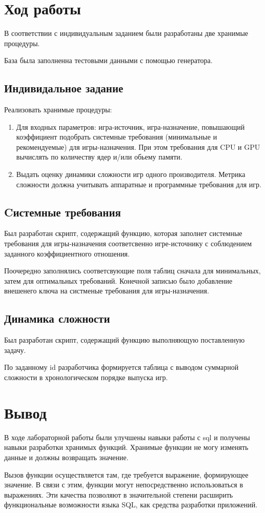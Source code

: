 \documentclass[a4paper,14pt]{extarticle}
\begin{document}
\section{Ход работы}
В соответствии с индивидуальным заданием были разработаны две хранимые процедуры.

База была заполненна тестовыми данными с помощью генератора.

\subsection{Индивидальное задание}
Реализовать хранимые процедуры:
\begin{enumerate}
	\item Для входных параметров: игра-источник, игра-назначение, повышающий коэффициент подобрать системные требования (минимальные и рекомендуемые) для игры-назначения. При этом требования для CPU и GPU вычислять по количеству ядер и/или обьему памяти.
	\item Выдать оценку динамики сложности игр одного производителя. Метрика сложности должна учитывать аппаратные и программные требования для игр.
\end{enumerate}

\subsection{Cистемные требования}
Был разработан скрипт, содержащий функцию, которая заполнет системные требования для игры-назначения соответсвенно игре-источнику с соблюдением заданного коэффициентного отношения.



Поочередно заполнялись соответсвующие поля таблиц сначала для минимальных, затем для оптимальных требований. Конечной записью было добавление внешенего ключа на систменые требования для игры-назначения.

\subsection{Динамика сложности}
Был разработан скрипт, содержащий функцию выполняющую поставленную задачу.


По заданному id разработчика формируется таблица с выводом суммарной сложности в хронологическом порядке выпуска игр.



\section{Вывод}
В ходе лабораторной работы были улучшены навыки работы с sql и получены навыки разработки хранимых функций. Хранимые функции не могу изменять данные и должны возвращать значение.

Вызов функции осуществляется там, где требуется выражение, формирующее значение. В связи с этим, функции могут непосредственно использоваться в выражениях. Эти качества позволяют в значительной степени расширить функциональные возможности языка SQL, как средства разработки приложений. 
\end{document}
